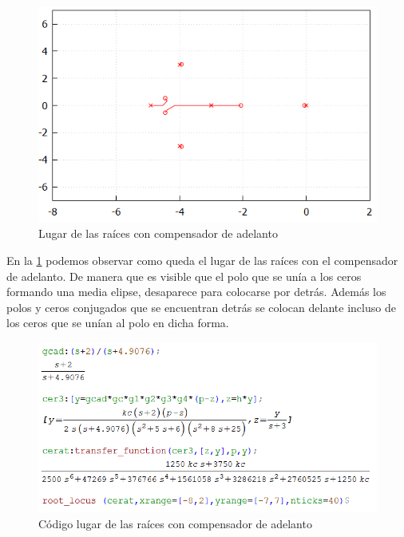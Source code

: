 \documentclass[12pt,letterpaper]{article}
\begin{document}
 \begin{figure}[H]
            \centering
            \centerline{\includegraphics[width=125mm]{RLadel.png}}
            \caption{Lugar de las raíces con compensador de adelanto}
            \label{RLadel}
\end{figure}

En la \ref{RLadel} podemos observar como queda el lugar de las raíces con el compensador de adelanto. De manera que es visible que el polo que se unía a los ceros formando una media elipse, desaparece para colocarse por detrás. Además los polos y ceros conjugados que se encuentran detrás se colocan delante incluso de los ceros que se unían al polo en dicha forma.

 \begin{figure}[H]
            \centering
            \centerline{\includegraphics[width=130mm]{RLadelcode.png}}
            \caption{Código lugar de las raíces con compensador de adelanto}
            \label{RLadelcode}
\end{figure}
\end{document}
